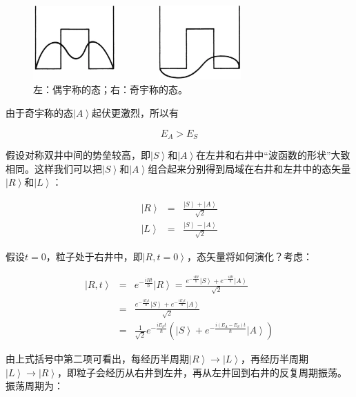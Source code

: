 \begin{figure}[htbp]
\begin{center}
\includegraphics[width=8cm]{Symmetry/symmetry-antisymmetry.png}
\caption{左：偶宇称的态；右：奇宇称的态。}
\end{center}
\end{figure}

由于奇宇称的态$\left| A \right\rangle$起伏更激烈，所以有

\begin{equation}
E_A > E_S
\end{equation}

假设对称双井中间的势垒较高，即$\left| S \right\rangle$和$\left| A \right\rangle$在左井和右井中“波函数的形状”大致相同。这样我们可以把$\left| S \right\rangle$和$\left| A \right\rangle$组合起来分别得到局域在右井和左井中的态矢量$\left| R \right\rangle$和$\left| L \right\rangle$：

\begin{eqnarray}
\left| R \right\rangle  & = & \frac{ \left| S \right\rangle + \left| A \right\rangle  }{\sqrt{2}} \\
\left| L \right\rangle & = & \frac{ \left| S \right\rangle - \left| A \right\rangle  }{\sqrt{2}}
\end{eqnarray}

假设$t=0$，粒子处于右井中，即$\left| R, t=0 \right\rangle$，态矢量将如何演化？考虑：

\begin{eqnarray*}
\left| R , t \right\rangle & = & e^{- \frac{iHt}{\hbar}}  \left| R \right\rangle =  \frac{ e^{- \frac{iHt}{\hbar}} \left| S \right\rangle + e^{- \frac{iHt}{\hbar}} \left| A \right\rangle   }{\sqrt 2} \\
{} & = & \frac{ e^{- \frac{iE_S t}{\hbar}} \left| S \right\rangle + e^{- \frac{i E_A t}{\hbar}} \left| A \right\rangle   }{\sqrt 2} \\
{} & = & \frac{1}{\sqrt 2} e^{ - \frac{i E_S t}{ \hbar} } \left( \left| S \right\rangle + e^{- \frac{i (E_A - E_S) t }{ \hbar}}  \left| A \right\rangle  \right)
\end{eqnarray*}

由上式括号中第二项可看出，每经历半周期$\left| R \right\rangle \to \left| L \right\rangle $，再经历半周期$\left| L \right\rangle \to \left| R \right\rangle $，即粒子会经历从右井到左井，再从左井回到右井的反复周期振荡。振荡周期为：

